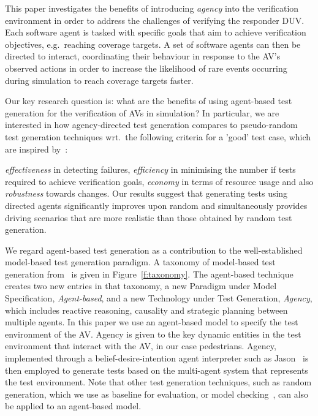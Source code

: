 \documentclass[letterpaper, 10 pt, journal, twoside]{IEEEtran}
\begin{document}
This paper investigates the benefits of introducing \textit{agency} into the verification environment in order to address the challenges of verifying the responder DUV. Each software agent is tasked with specific goals that aim to achieve verification objectives, e.g.\ reaching coverage targets. A set of software agents can then be directed to interact, coordinating their behaviour in response to the AV's observed actions in order to increase the likelihood of rare events occurring during simulation to reach coverage targets faster.

Our key research question is: what are the benefits of using agent-based test generation for the verification of AVs in simulation? In particular, we are interested in how agency-directed test generation compares to pseudo-random test generation techniques wrt.\ the following criteria for a 'good' test case, which are inspired by~\cite{fewster1999software}:

\textit{effectiveness} in detecting failures, \textit{efficiency} in minimising the number if tests required to achieve verification goals, \textit{economy} in terms of resource usage and also \textit{robustness} towards changes. Our results suggest that generating tests using directed agents significantly improves upon random and simultaneously provides driving scenarios that are more realistic than those obtained by random test generation.

We regard agent-based test generation as a contribution to the well-established model-based test generation paradigm. A taxonomy of model-based test generation from~\cite{utting2012taxonomy} is given in Figure~\ref{f:taxonomy}. The agent-based technique creates two new entries in that taxonomy, a new Paradigm under Model Specification, \textit{Agent-based}, and a new Technology under Test Generation, \textit{Agency}, which includes reactive reasoning, causality and strategic planning between multiple agents. In this paper we use an agent-based model to specify the test environment of the AV. Agency is given to the key dynamic entities in the test environment that interact with the AV, in our case pedestrians. Agency, implemented through a belief-desire-intention agent interpreter such as Jason~\cite{bordini2005jason} is then employed to generate tests based on the multi-agent system that represents the test environment. Note that other test generation techniques, such as random generation, which we use as baseline for evaluation, or model checking~\cite{Bordini2006}, can also be applied to an agent-based model.
\end{document}
